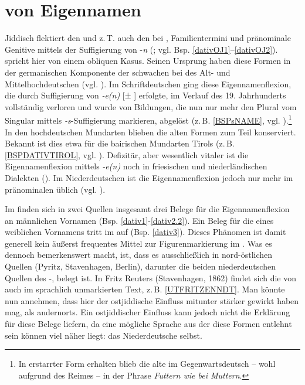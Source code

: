  
 \section{ von Eigennamen}\label{dativnamen}
 Jiddisch flektiert den  und z.\,T. auch den  bei , Familientermini und pränominale Genitive mittels der Suffigierung von -\textit{n} (\cite[161f]{Jacobs2005}; vgl. Bsp. \ref{dativOJ1}–\ref{dativOJ2}). \textcite[161]{Jacobs2005} spricht hier von einem obliquen Kasus. Seinen Ursprung haben diese Formen in der germanischen Komponente der schwachen  bei  des Alt- und Mittelhochdeutschen (vgl. \cite[insbes. 230f]{Nuebling2012}). Im Schriftdeutschen ging diese Eigennamenflexion, die durch Suffigierung von \textit{-e(n)} [± ] erfolgte, im Verlauf des 19. Jahrhunderts vollständig verloren und wurde von Bildungen, die nun nur mehr den Plural vom Singular mittels \textit{-s}-Suffigierung markieren, abgelöst (z.\,B. \ref{BSPsNAME}, vgl. \cite[240]{Nuebling2012}).\footnote{In erstarrter Form erhalten blieb die alte  im Gegenwartsdeutsch – wohl aufgrund des Reimes – in der Phrase \textit{Futtern wie bei Muttern}.} In den hochdeutschen Mundarten blieben die alten Formen zum Teil konserviert. Bekannt ist dies etwa für die bairischen Mundarten Tirols (z.\,B. \ref{BSPDATIVTIROL}, vgl. \cite[50]{Schatz1903}). Defizitär, aber wesentlich vitaler ist die Eigennamenflexion mittels \textit{-e(n)} noch in friesischen und niederländischen Dialekten (\cite{Hoekstra2010}). Im Niederdeutschen ist die Eigennamenflexion jedoch nur mehr im pränominalen  üblich (vgl. \cite[144]{Lindowetal1998}). 

 Im  finden sich in zwei Quellen insgesamt drei Belege für die Eigennamenflexion an männlichen Vornamen (Bsp. \ref{dativ1}-\ref{dativ2.2}). Ein Beleg für die  eines weiblichen Vornamens tritt im  auf (Bsp. \ref{dativ3}). Dieses Phänomen ist damit generell kein äußerst frequentes Mittel zur Figurenmarkierung im . Was es dennoch bemerkenswert macht, ist, dass es ausschließlich in nord-östlichen Quellen (Pyritz, Stavenhagen, Berlin), darunter die beiden niederdeutschen Quellen des -, belegt ist. In Fritz Reuters  (Stavenhagen, 1862) findet sich die  von  auch im sprachlich unmarkierten Text, z.\,B. \ref{UTFRITZENNDT}. Man könnte nun annehmen, dass hier der ostjiddische Einfluss mitunter stärker gewirkt haben mag, als andernorts. Ein ostjiddischer Einfluss kann jedoch nicht die Erklärung für diese Belege liefern, da eine mögliche Sprache aus der diese Formen entlehnt sein können viel näher liegt: das Niederdeutsche selbst. \\
 


